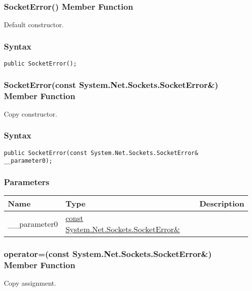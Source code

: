 \documentclass[a4paper,oneside,11.000000pt]{book}
\begin{document}
\hypertarget{System.Net.Sockets.SocketError.constructor.P.System.Net.Sockets.SocketError}{\subsubsection*{SocketError() Member Function}}\begin{flushleft}
Default constructor.

\end{flushleft}
\subsubsection*{Syntax}
\texttt{public SocketError();}
\clearpage

\hypertarget{System.Net.Sockets.SocketError.constructor.P.System.Net.Sockets.SocketError.C.R.System.Net.Sockets.SocketError}{\subsubsection*{SocketError(const System.Net.Sockets.SocketError\&) Member Function}}\begin{flushleft}
Copy constructor.

\end{flushleft}
\subsubsection*{Syntax}
\texttt{public SocketError(const System.Net.Sockets.SocketError\& \_\_parameter0);}
\subsubsection*{Parameters}
\begin{flushleft}
\begin{supertabular}[l]{!{\raggedright}p{2.61335cm}!{\raggedright}p{7.25332cm}!{\raggedright}p{2.65538cm}}
\textbf{Name}
& \textbf{Type}
& \textbf{Description}
\\
\hline
\_\_parameter0
& \hyperlink{System.Net.Sockets.SocketError}{const System.\-Net.\-Sockets.\-SocketError\&\-}
& 
\\
\end{supertabular}

\end{flushleft}
\clearpage

\hypertarget{System.Net.Sockets.SocketError.operator.assign.P.System.Net.Sockets.SocketError.C.R.System.Net.Sockets.SocketError}{\subsubsection*{operator=(const System.Net.Sockets.SocketError\&) Member Function}}\begin{flushleft}
Copy assignment.

\end{flushleft}
\end{document}
